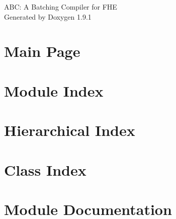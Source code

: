 \let\mypdfximage\pdfximage\def\pdfximage{\immediate\mypdfximage}\documentclass[twoside]{book}
\newcommand{\+}{\discretionary{\mbox{\scriptsize$\hookleftarrow$}}{}{}}
\newcommand{\clearemptydoublepage}{%
  \newpage{\pagestyle{empty}\cleardoublepage}%
}
\begin{document}
\raggedbottom

\hypersetup{pageanchor=false,
             bookmarksnumbered=true,
             pdfencoding=unicode
            }
\begin{titlepage}
\vspace*{7cm}
\begin{center}%
{\Large ABC\+: A Batching Compiler for FHE }\\
\vspace*{1cm}
{\large Generated by Doxygen 1.9.1}\\
\end{center}
\end{titlepage}
\clearemptydoublepage
{}
\tableofcontents
\clearemptydoublepage
{}
\hypersetup{pageanchor=true}

\chapter{Main Page}
\label{index}\hypertarget{index}{}
\chapter{Module Index}

\chapter{Hierarchical Index}

\chapter{Class Index}

\chapter{Module Documentation}



\end{document}
